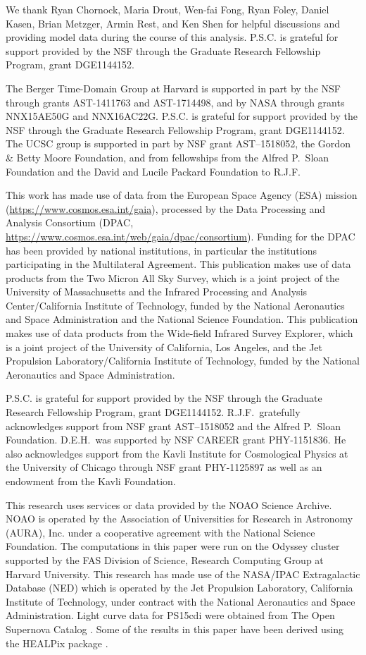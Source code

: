 We thank Ryan Chornock, Maria Drout, Wen-fai Fong, Ryan Foley, Daniel Kasen, Brian Metzger, Armin Rest, and Ken Shen for helpful discussions and providing model data during the course of this analysis. P.S.C. is grateful for support provided by the NSF through the Graduate Research Fellowship Program, grant DGE1144152.

The Berger Time-Domain Group at Harvard is supported in part by the NSF through grants AST-1411763 and AST-1714498, and by NASA through grants NNX15AE50G and NNX16AC22G. P.S.C. is grateful for support provided by the NSF
through the Graduate Research Fellowship Program, grant DGE1144152. The UCSC group is supported in part by NSF grant AST--1518052, the Gordon \& Betty Moore Foundation, and from fellowships from the Alfred P.\ Sloan Foundation and the David and Lucile Packard Foundation to R.J.F.

This work has made use of data from the European Space Agency (ESA)
mission \gaia (\url{https://www.cosmos.esa.int/gaia}), processed by
the \gaia Data Processing and Analysis Consortium (DPAC,
\url{https://www.cosmos.esa.int/web/gaia/dpac/consortium}). Funding
for the DPAC has been provided by national institutions, in particular
the institutions participating in the \gaia Multilateral Agreement.
This publication makes use of data products from the Two Micron All Sky Survey,
which is a joint project of the University of Massachusetts and the Infrared Processing
and Analysis Center/California Institute of Technology, funded by the National Aeronautics
and Space Administration and the National Science Foundation. This publication makes use
of data products from the Wide-field Infrared Survey Explorer, which is a joint project of the
University of California, Los Angeles, and the Jet Propulsion Laboratory/California Institute of
Technology, funded by the National Aeronautics and Space Administration.

P.S.C. is grateful for support provided by the NSF
through the Graduate Research Fellowship Program, grant DGE1144152.
R.J.F.\ gratefully acknowledges support from NSF grant AST--1518052 and
the Alfred P.\ Sloan Foundation. D.E.H.\ was supported by NSF CAREER grant
PHY-1151836. He also acknowledges support from the Kavli Institute for
Cosmological Physics at the University of Chicago through NSF grant
PHY-1125897 as well as an endowment from the Kavli Foundation.

This research uses services or data provided by the NOAO Science
Archive. NOAO is operated by the Association of Universities for
Research in Astronomy (AURA), Inc. under a cooperative agreement with
the National Science Foundation. The computations in this paper were
run on the Odyssey cluster supported by the FAS Division of Science,
Research Computing Group at Harvard University. This research has made
use of the NASA/IPAC Extragalactic Database (NED) which is operated by
the Jet Propulsion Laboratory, California Institute of Technology,
under contract with the National Aeronautics and Space Administration.
Light curve data for PS15cdi were obtained from The Open Supernova
Catalog \citep{Guillochon+17}. Some of the results in this paper have been
derived using the HEALPix package \citep{Gorski+05}.

